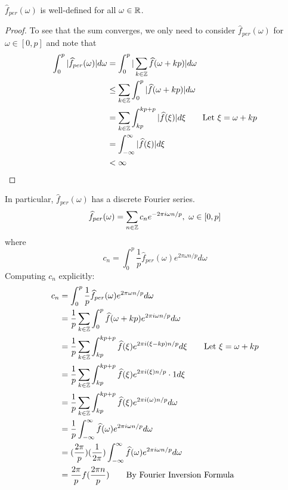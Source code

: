 \documentclass{article}
\begin{document}
\begin{proposition}
    $\widehat{f}_{per}(\omega)$ is well-defined for all $\omega \in \mathbb{R}$.
\end{proposition}

\begin{proof}
    To see that the sum converges, we only need to consider $\widehat{f}_{per}(\omega)$ for $\omega \in [0, p]$ and note that
\begin{align*}
    \int_0^p |\widehat{f}_{per}(\omega)| d\omega &= \int_0^p |\sum_{k \in \mathbb{Z}} \widehat{f}(\omega + kp)| d\omega\\
    &\leq \sum_{k \in \mathbb{Z}} \int_0^p |\widehat{f}(\omega + kp)| d\omega\\
    &= \sum_{k \in \mathbb{Z}} \int_{kp}^{kp +p} |\widehat{f}(\xi)| d\xi \tag*{Let $\xi = \omega + kp$}\\
    &= \int_{-\infty}^\infty |\widehat{f}(\xi)| d\xi\\
    &< \infty
\end{align*}
\end{proof}

In particular, $\widehat{f}_{per}(\omega)$ has a discrete Fourier series.
\[\widehat{f}_{per}(\omega) = \sum_{n \in \mathbb{Z}} c_n e^{-2\pi i \omega n/p},\ \omega \in [0, p]\]
where
\[c_n = \int_0^p \frac{1}{p} \widehat{f}_{per}(\omega) e^{2\pi \omega n/p} d\omega\]
Computing $c_n$ explicitly:
\begin{align*}
    c_n &= \int_0^p \frac{1}{p} \widehat{f}_{per}(\omega) e^{2\pi \omega n/p} d\omega\\
    &= \frac{1}{p} \sum_{k \in \mathbb{Z}} \int_0^p \widehat{f}(\omega + kp) e^{2\pi i \omega n/p} d\omega\\
    &= \frac{1}{p} \sum_{k \in \mathbb{Z}} \int_{kp}^{kp+p} \widehat{f}(\xi) e^{2\pi i(\xi - kp)n/p} d\xi \tag*{Let $\xi = \omega + kp$}\\
    &= \frac{1}{p} \sum_{k \in \mathbb{Z}} \int_{kp}^{kp+p} \widehat{f}(\xi) e^{2\pi i(\xi)n/p}\cdot 1 d\xi\\
    &= \frac{1}{p} \sum_{k \in \mathbb{Z}} \int_{kp}^{kp+p} \widehat{f}(\xi) e^{2\pi i(\omega)n/p} d\omega\\
    &= \frac{1}{p} \int_{-\infty}^\infty \widehat{f}(\omega) e^{2\pi i \omega n/p} d\omega\\
    &= (\frac{2\pi}{p}) (\frac{1}{2\pi}) \int_{-\infty}^\infty \widehat{f}(\omega) e^{2\pi i \omega n/p} d\omega\\
    &= \frac{2\pi}{p} f(\frac{2\pi n}{p}) \tag*{By Fourier Inversion Formula}
\end{align*}
\end{document}
